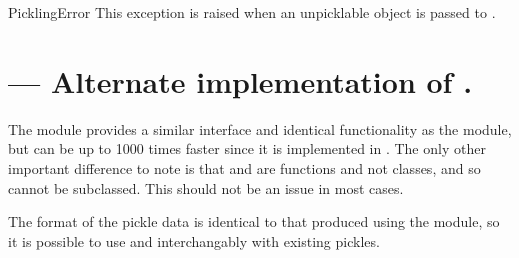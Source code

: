 \begin{excdesc}{PicklingError}
This exception is raised when an unpicklable object is passed to
.
\end{excdesc}


\begin{seealso}



\end{seealso}


\section{ ---
         Alternate implementation of .}




The  module provides a similar interface and identical
functionality as the  module, but can be up to 1000
times faster since it is implemented in \C{}.  The only other
important difference to note is that  and
 are functions and not classes, and so cannot be
subclassed.  This should not be an issue in most cases.

The format of the pickle data is identical to that produced using the
 module, so it is possible to use  and
 interchangably with existing pickles.
